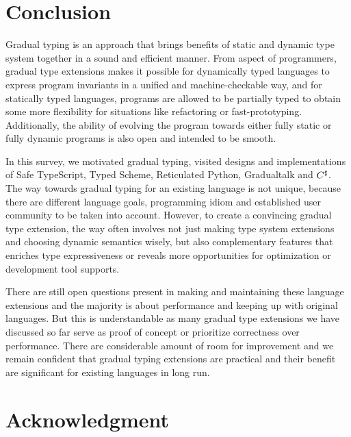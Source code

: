 \section{Conclusion}

Gradual typing is an approach that brings benefits of static and dynamic type system
together in a sound and efficient manner.
From aspect of programmers, gradual type extensions makes it possible
for dynamically typed languages
to express program invariants in a unified and machine-checkable way,
and for statically typed languages,
programs are allowed to be partially typed to obtain some more flexibility
for situations like refactoring or fast-prototyping.
Additionally, the ability of evolving the program towards
either fully static or fully dynamic programs is also open and intended to be smooth.

In this survey, we motivated gradual typing, visited designs and implementations of Safe TypeScript,
Typed Scheme, Reticulated Python, Gradualtalk and $C^\sharp$.
The way towards gradual typing for an existing language is not unique,
because there are different language goals, programming idiom and established user community
to be taken into account.
However, to create a convincing gradual type extension, the way often involves 
not just making type system extensions and choosing dynamic semantics wisely,
but also complementary features that enriches type expressiveness or
reveals more opportunities for optimization or development tool supports.

There are still open questions present in making and maintaining these language extensions and
the majority is about performance and keeping up with original languages.
But this is understandable as many gradual type extensions we have discussed so far
serve as proof of concept or prioritize correctness over performance.
There are considerable amount of room for improvement and we remain confident that
gradual typing extensions are practical and their benefit are significant for existing languages in long run.

\section*{Acknowledgment}
